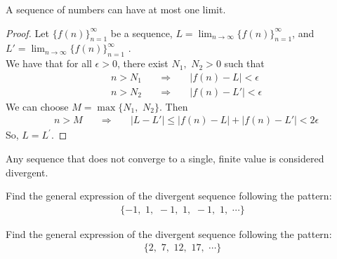 \begin{theorem}
A sequence of numbers can have at most one limit.
\begin{proof}
    Let $\{f(n)\}_{n=1}^{\infty}$ be a sequence, $L = \lim_{n \longrightarrow \infty} \{f(n)\}_{n=1}^{\infty}$, and $L' = \lim_{n \longrightarrow \infty} \{f(n)\}_{n=1}^{\infty}$ .\\
    We have that for all $\epsilon > 0$, there exist $N_{1}, \hspace{4pt} N_{2} > 0$ such that
    \begin{align*}
        &n > N_{1} \hspace{20pt} \Longrightarrow \hspace{20pt} \lvert f(n) - L \rvert < \epsilon \\[2ex]
        &n > N_{2} \hspace{20pt} \Longrightarrow \hspace{20pt} \lvert f(n) - L' \rvert < \epsilon
    \end{align*}
    We can choose $M = \max\{N_1, \hspace{4pt} N_{2}\}$. Then
    \begin{align*}
        &n > M \hspace{20pt} \Longrightarrow \hspace{20pt} \lvert L - L' \rvert \leq \lvert f(n) - L \rvert + \lvert f(n) - L' \rvert < 2\epsilon
    \end{align*}
    So, $L = L^{'}$.
\end{proof}
\label{limit_uniqueness}
\end{theorem}

\begin{note}
Any sequence that does not converge to a single, finite value is considered divergent.
\end{note}

\begin{exercise}
Find the general expression of the divergent sequence following the pattern:
\begin{align*}
    \{-1, \hspace{4pt} 1, \hspace{4pt} -1, \hspace{4pt} 1, \hspace{4pt} -1, \hspace{4pt} 1, \hspace{4pt} \cdots\}
\end{align*}
\end{exercise}

\begin{exercise}
Find the general expression of the divergent sequence following the pattern:
\begin{align*}
    \{2, \hspace{4pt} 7, \hspace{4pt} 12, \hspace{4pt} 17, \hspace{4pt} \cdots\}
\end{align*}
\end{exercise}

